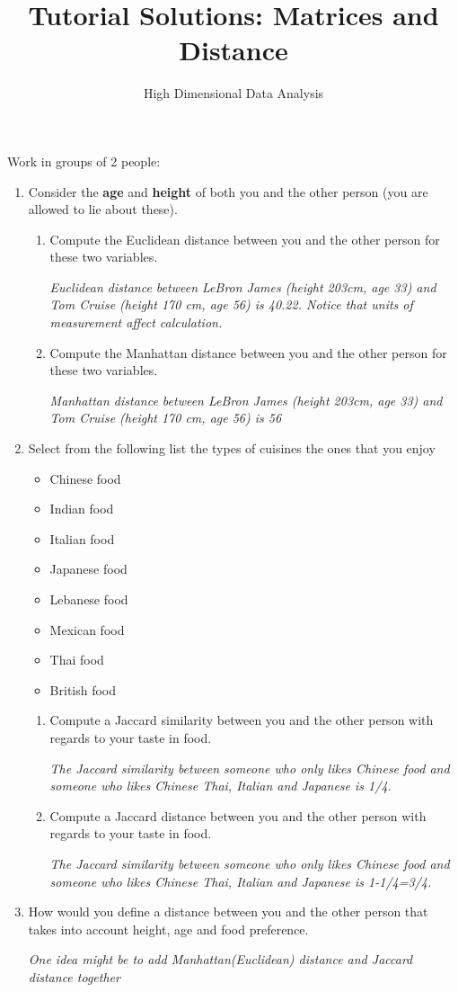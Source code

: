 \documentclass{article}
\title{Tutorial Solutions:  Matrices and Distance}
\author{High Dimensional Data Analysis}
\date{}
\begin{document}
	
Work in groups of 2 people:
\begin{enumerate}
	\item Consider the \textbf{age} and \textbf{height} of both you and the other person (you are allowed to lie about these).  
	\begin{enumerate}
		\item Compute the Euclidean distance between you and the other person for these two variables.
		
		{\em Euclidean distance between LeBron James (height 203cm, age 33) and Tom Cruise (height 170 cm, age 56) is 40.22.  Notice that units of measurement affect calculation.}
		\item Compute the Manhattan distance between you and the other person for these two variables.
		
		{\em Manhattan distance between LeBron James (height 203cm, age 33) and Tom Cruise (height 170 cm, age 56) is 56}
	\end{enumerate}
	\item Select from the following list the types of cuisines the ones that you enjoy
	\begin{multicols}{2}
		\begin{itemize}
			\item Chinese food
			\item Indian food
			\item Italian food
			\item Japanese food
			\item Lebanese food
			\item Mexican food
			\item Thai food
			\item British food
		\end{itemize}
	\end{multicols}
	\begin{enumerate}
		\item Compute a Jaccard similarity between you and the other person with regards to your taste in food.
		
		{\em The Jaccard similarity between someone who only likes Chinese food and someone who likes Chinese Thai, Italian and Japanese is 1/4.} 
		\item Compute a Jaccard distance between you and the other person with regards to your taste in food.
		
		{\em The Jaccard similarity between someone who only likes Chinese food and someone who likes Chinese Thai, Italian and Japanese is 1-1/4=3/4.}
	\end{enumerate}
	\item How would you define a distance between you and the other person that takes into account height, age and food preference.
	
	{\em One idea might be to add Manhattan(Euclidean) distance and Jaccard distance together}
\end{enumerate}
\end{document}
